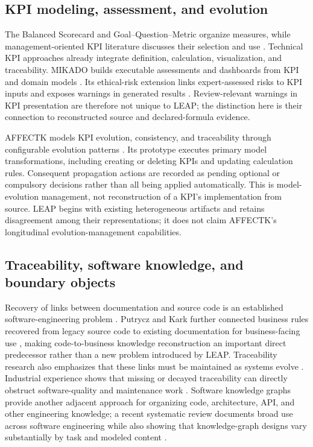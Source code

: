 \documentclass[a4paper,fleqn]{cas-dc}
\begin{document}
\subsection{KPI modeling, assessment, and evolution}

The Balanced Scorecard \citep{Kaplan1996} and Goal--Question--Metric \citep{VanSolingen2002} organize measures, while management-oriented KPI literature discusses their selection and use \citep{Parmenter2015,Eckerson2011,Marr2012}. Technical KPI approaches already integrate definition, calculation, visualization, and traceability. MIKADO builds executable assessments and dashboards from KPI and domain models \citep{DeSanctis2022}. Its ethical-risk extension links expert-assessed risks to KPI inputs and exposes warnings in generated results \citep{DeSanctis2025Ethics}. Review-relevant warnings in KPI presentation are therefore not unique to LEAP; the distinction here is their connection to reconstructed source and declared-formula evidence.

AFFECTK models KPI evolution, consistency, and traceability through configurable evolution patterns \citep{Dominguez2025}. Its prototype executes primary model transformations, including creating or deleting KPIs and updating calculation rules. Consequent propagation actions are recorded as pending optional or compulsory decisions rather than all being applied automatically. This is model-evolution management, not reconstruction of a KPI's implementation from source. LEAP begins with existing heterogeneous artifacts and retains disagreement among their representations; it does not claim AFFECTK's longitudinal evolution-management capabilities.

\subsection{Traceability, software knowledge, and boundary objects}

Recovery of links between documentation and source code is an established software-engineering problem \citep{Marcus2005}. Putrycz and Kark further connected business rules recovered from legacy source code to existing documentation for business-facing use \citep{PutryczKark2008}, making code-to-business knowledge reconstruction an important direct predecessor rather than a new problem introduced by LEAP. Traceability research also emphasizes that these links must be maintained as systems evolve \citep{MaderGotel2012}. Industrial experience shows that missing or decayed traceability can directly obstruct software-quality and maintenance work \citep{Fucci2022}. Software knowledge graphs provide another adjacent approach for organizing code, architecture, API, and other engineering knowledge; a recent systematic review documents broad use across software engineering while also showing that knowledge-graph designs vary substantially by task and modeled content \citep{Wang2023}.
\end{document}
